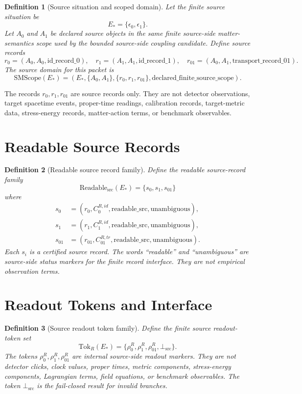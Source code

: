 \documentclass[11pt]{article}
\newcommand{\EStar}{E_{\ast}}
\newcommand{\SMScope}{\mathrm{SMScope}}
\newcommand{\ReadableSrc}{\mathrm{Readable}_{\mathrm{src}}}
\newcommand{\TokR}{\mathrm{Tok}_{R}}
\newcommand{\BottomSrc}{\bot_{\mathrm{src}}}
\newtheorem{definition}{Definition}
\begin{document}
\begin{definition}[Source situation and scoped domain]
Let the finite source situation be
\[
  \EStar=\{\epsilon_0,\epsilon_1\}.
\]
Let \(A_0\) and \(A_1\) be declared source objects in the same finite
source-side matter-semantics scope used by the bounded source-side coupling
candidate. Define source records
\[
  r_0=(A_0,A_0,\mathrm{id\_record\_0}),\quad
  r_1=(A_1,A_1,\mathrm{id\_record\_1}),\quad
  r_{01}=(A_0,A_1,\mathrm{transport\_record\_01}).
\]
The source domain for this packet is
\[
  \SMScope(\EStar)=
  (\EStar,\{A_0,A_1\},\{r_0,r_1,r_{01}\},
  \mathrm{declared\_finite\_source\_scope}).
\]
\end{definition}

The records \(r_0,r_1,r_{01}\) are source records only. They are not detector
observations, target spacetime events, proper-time readings, calibration
records, target-metric data, stress-energy records, matter-action terms, or
benchmark observables.

\section{Readable Source Records}

\begin{definition}[Readable source record family]
Define the readable source-record family
\[
  \ReadableSrc(\EStar)=\{s_0,s_1,s_{01}\}
\]
where
\[
\begin{aligned}
  s_0 &= (r_0,C^{R,id}_0,\mathrm{readable\_src},\mathrm{unambiguous}),\\
  s_1 &= (r_1,C^{R,id}_1,\mathrm{readable\_src},\mathrm{unambiguous}),\\
  s_{01} &= (r_{01},C^{R,tr}_{01},\mathrm{readable\_src},
    \mathrm{unambiguous}).
\end{aligned}
\]
Each \(s_i\) is a certified source record. The words
``readable'' and ``unambiguous'' are source-side status markers for the
finite record interface. They are not empirical observation terms.
\end{definition}

\section{Readout Tokens and Interface}

\begin{definition}[Source readout token family]
Define the finite source readout-token set
\[
  \TokR(\EStar)=\{\rho^R_0,\rho^R_1,\rho^R_{01},\BottomSrc\}.
\]
The tokens \(\rho^R_0,\rho^R_1,\rho^R_{01}\) are internal source-side
readout markers. They are not detector clicks, clock values, proper times,
metric components, stress-energy components, Lagrangian terms, field
equations, or benchmark observables. The token \(\BottomSrc\) is the
fail-closed result for invalid branches.
\end{definition}
\end{document}
